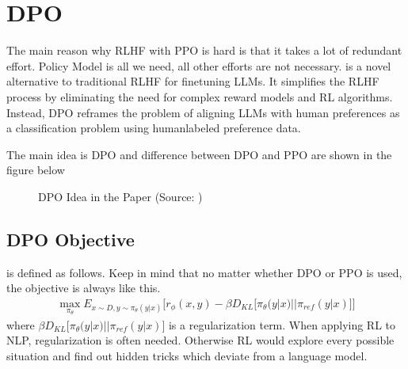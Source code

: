 \documentclass[letterpaper,11pt,english]{sphinxmanual}
\begin{document}
\section{DPO}
\label{\detokenize{rlhf:dpo}}
\sphinxAtStartPar
The main reason why RLHF with PPO is hard is that it takes a lot of
redundant effort. Policy Model is all we need, all other efforts are not
necessary.  is a novel
alternative to traditional RLHF for fine\sphinxhyphen{}tuning LLMs. It simplifies the
RLHF process by eliminating the need for complex reward models and RL
algorithms. Instead, DPO reframes the problem of aligning LLMs with
human preferences as a classification problem using human\sphinxhyphen{}labeled
preference data. 

\sphinxAtStartPar
The main idea is DPO and difference between DPO and PPO are shown in the
figure below

\begin{figure}[htbp]
\centering
\capstart

\noindent{}
\caption{DPO Idea in the Paper (Source: )}\label{\detokenize{rlhf:id11}}\end{figure}


\subsection{DPO Objective}
\label{\detokenize{rlhf:dpo-objective}}
\sphinxAtStartPar
{} is defined as follows. Keep in mind that no matter
whether DPO or PPO is used, the objective is always like this.
\begin{equation*}
\begin{split}\max_{\pi_\theta} E_{x \sim D, y \sim \pi_\theta(y|x)}\Big[r_{\phi}(x,y) - \beta D_{KL}\big[\pi_\theta(y|x) || \pi_{ref}(y|x)\big]\Big]\end{split}
\end{equation*}
\sphinxAtStartPar
where \(\beta D_{KL}\big[\pi_\theta(y|x) || \pi_{ref}(y|x)\big]\) is
a regularization term. When applying RL to NLP, regularization is often
needed. Otherwise RL would explore every possible situation and find out
hidden tricks which deviate from a language model.
\end{document}
